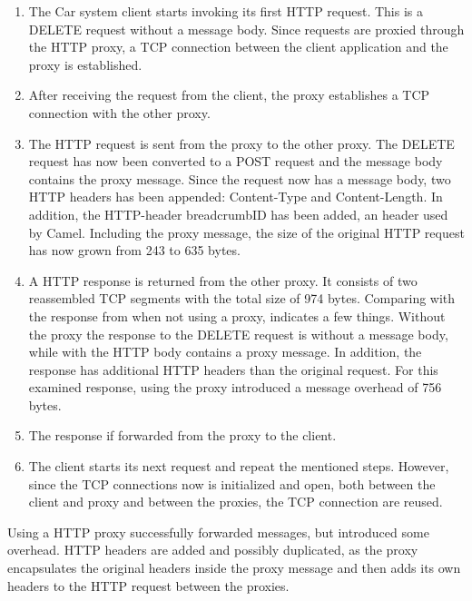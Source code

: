 \begin{enumerate}

    \item The Car system client starts invoking its first HTTP request. This is
    a DELETE request without a message body. Since requests are proxied through
    the HTTP proxy, a TCP connection between the client application and the
    proxy is established.

    \item After receiving the request from the client, the proxy establishes a
    TCP connection with the other proxy.

    \item The HTTP request is sent from the proxy to the other proxy. The DELETE
    request has now been converted to a POST request and the message body
    contains the proxy message. Since the request now has a message body, two
    HTTP headers has been appended: Content-Type and Content-Length. In
    addition, the HTTP-header breadcrumbID has been added, an header used by
    Camel. Including the proxy message, the size of the original HTTP request
    has now grown from 243 to 635 bytes.

	\item A HTTP response is returned from the other proxy. It consists of two
	reassembled TCP segments with the total size of 974  bytes. Comparing with the
	response from when not using a proxy, indicates a few things. Without the proxy
	the response to the DELETE request is without a message body, while with the
	HTTP body contains a proxy message. In addition, the response has additional
	HTTP headers than the original request. For this examined response, using the
	proxy introduced a message overhead of 756 bytes.

    \item The response if forwarded from the proxy to the client.

    \item The client starts its next request and repeat the mentioned steps.
    However, since the TCP connections now is initialized and open, both between
    the client and proxy and between the proxies, the TCP connection are reused.


  \end{enumerate}

Using a HTTP proxy successfully forwarded messages, but introduced some
overhead. HTTP headers are added and possibly duplicated, as the proxy
encapsulates the original headers inside the proxy message and then adds
its own headers to the HTTP request between the proxies.


